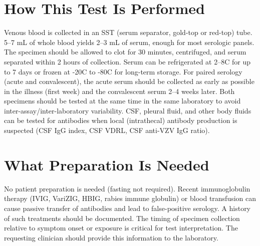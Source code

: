 \section*{How This Test Is Performed}
Venous blood is collected in an SST (serum separator, gold-top or red-top) tube. 5--7 mL of whole blood yields 2--3 mL of serum, enough for most serologic panels. The specimen should be allowed to clot for 30 minutes, centrifuged, and serum separated within 2 hours of collection. Serum can be refrigerated at 2--8\textdegree{}C for up to 7 days or frozen at -20\textdegree{}C to -80\textdegree{}C for long-term storage. For paired serology (acute and convalescent), the acute serum should be collected as early as possible in the illness (first week) and the convalescent serum 2--4 weeks later. Both specimens should be tested at the same time in the same laboratory to avoid inter-assay/inter-laboratory variability. CSF, pleural fluid, and other body fluids can be tested for antibodies when local (intrathecal) antibody production is suspected (CSF IgG index, CSF VDRL, CSF anti-VZV IgG ratio).

\section*{What Preparation Is Needed}
No patient preparation is needed (fasting not required). Recent immunoglobulin therapy (IVIG, VariZIG, HBIG, rabies immune globulin) or blood transfusion can cause passive transfer of antibodies and lead to false-positive serology. A history of such treatments should be documented. The timing of specimen collection relative to symptom onset or exposure is critical for test interpretation. The requesting clinician should provide this information to the laboratory.

